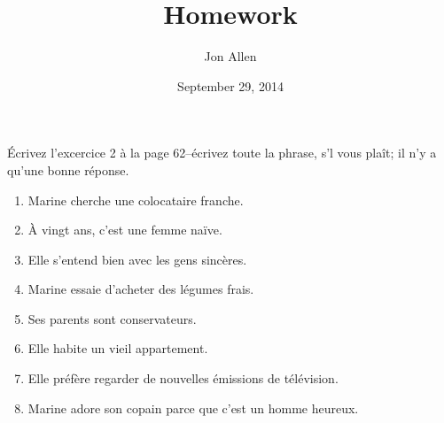 \documentclass[letterpaper]{article}
\begin{document}
\title{Homework}
\date{September 29, 2014}
\author{Jon Allen}
\maketitle
Écrivez l'excercice 2 à la page 62--écrivez toute la phrase, s'l vous plaît; il n'y a qu'une bonne réponse.
\begin{enumerate}
\item
Marine cherche une colocataire franche.
\item
À vingt ans, c'est une femme naïve.
\item
Elle s'entend bien avec les gens sincères.
\item
Marine essaie d'acheter des légumes frais.
\item
Ses parents sont conservateurs.
\item
Elle habite un vieil appartement.
\item
Elle préfère regarder de nouvelles émissions de télévision.
\item
Marine adore son copain parce que c'est un homme heureux.
\end{enumerate}
\end{document}
